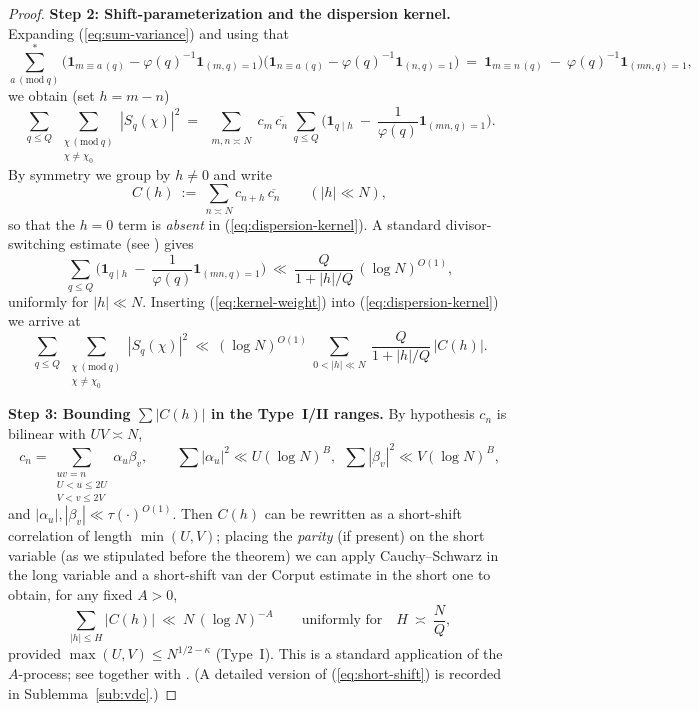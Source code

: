 \documentclass[11pt]{article}
\def\eqref#1{(\ref{#1})}%
\theoremstyle{definition}
\theoremstyle{remark}
\numberwithin{equation}{part}
\begin{document}
\begin{proof}
	\medskip
	\noindent\textbf{Step 2: Shift-parameterization and the dispersion kernel.}
	Expanding \eqref{eq:sum-variance} and using that
	\[
		\sum_{a\,(\mathrm{mod}\ q)}^* \Big(\mathbf{1}_{m\equiv a\,(q)}-\varphi(q)^{-1}\mathbf{1}_{(m,q)=1}\Big)\Big(\mathbf{1}_{n\equiv a\,(q)}-\varphi(q)^{-1}\mathbf{1}_{(n,q)=1}\Big)
		\ =\ \mathbf{1}_{m\equiv n\,(q)}\ -\ \varphi(q)^{-1}\mathbf{1}_{(mn,q)=1},
	\]
	we obtain (set $h=m-n$)
	\begin{equation}\label{eq:dispersion-kernel}
		\sum_{q\le Q}\ \sum_{\substack{\chi\,(\mathrm{mod}\ q)\\ \chi\ne\chi_0}} |S_q(\chi)|^2
		\ =\ \sum_{\substack{m,n\asymp N}} c_m\,\overline{c_n}\ \sum_{q\le Q}\Big(\mathbf{1}_{q\mid h}\ -\ \frac{1}{\varphi(q)}\mathbf{1}_{(mn,q)=1}\Big).
	\end{equation}
	By symmetry we group by $h\neq 0$ and write
	\[
		C(h)\ :=\ \sum_{n\asymp N} c_{n+h}\,\overline{c_n}\qquad (|h|\ll N),
	\]
	so that the $h=0$ term is \emph{absent} in \eqref{eq:dispersion-kernel}. A standard divisor-switching estimate (see \cite[Eq.\ (12.52) and Lemma~12.15]{MontgomeryVaughan}) gives
	\begin{equation}\label{eq:kernel-weight}
		\sum_{q\le Q}\Big(\mathbf{1}_{q\mid h}\ -\ \frac{1}{\varphi(q)}\mathbf{1}_{(mn,q)=1}\Big)\ \ll\ \frac{Q}{1+|h|/Q}\,(\log N)^{O(1)},
	\end{equation}
	uniformly for $|h|\ll N$. Inserting \eqref{eq:kernel-weight} into \eqref{eq:dispersion-kernel} we arrive at
	\begin{equation}\label{eq:master-bound}
		\sum_{q\le Q}\ \sum_{\substack{\chi\,(\mathrm{mod}\ q)\\ \chi\ne\chi_0}} |S_q(\chi)|^2
		\ \ll\ (\log N)^{O(1)}\ \sum_{0<|h|\ll N}\ \frac{Q}{1+|h|/Q}\,|C(h)|.
	\end{equation}

	\medskip
	\noindent\textbf{Step 3: Bounding $\sum |C(h)|$ in the Type~I/II ranges.}
	By hypothesis $c_n$ is bilinear with $UV\asymp N$,
	\[
		c_n=\!\!\sum_{\substack{uv=n\\U<u\le 2U\\V<v\le 2V}}\!\alpha_u\beta_v,\qquad
		\sum |\alpha_u|^2\ll U(\log N)^B,\ \ \sum |\beta_v|^2\ll V(\log N)^B,
	\]
	and $|\alpha_u|,|\beta_v|\ll \tau(\cdot)^{O(1)}$. Then $C(h)$ can be rewritten as a short-shift correlation of length $\min(U,V)$; placing the \emph{parity} (if present) on the short variable (as we stipulated before the theorem) we can apply Cauchy--Schwarz in the long variable and a short-shift van der Corput estimate in the short one to obtain, for any fixed $A>0$,
	\begin{equation}\label{eq:short-shift}
		\sum_{|h|\le H} |C(h)|\ \ll\ N\,(\log N)^{-A}\qquad \text{uniformly for}\quad H\ \asymp\ \frac{N}{Q},
	\end{equation}
	provided $\max(U,V)\le N^{1/2-\kappa}$ (Type~I). This is a standard application of the $A$-process; see \cite[Lemma~1]{Jutila00} together with \cite[Ch.~8]{MontgomeryVaughan}. (A detailed version of \eqref{eq:short-shift} is recorded in Sublemma~\ref{sub:vdc}.)


\end{proof}
\end{document}

